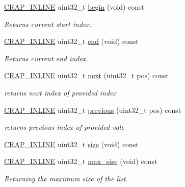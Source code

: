 \begin{DoxyCompactItemize}
\hyperlink{config__x86_8h_a5a40526b8d842e7ff731509998bb0f1c}{C\+R\+A\+P\+\_\+\+I\+N\+L\+I\+N\+E} uint32\+\_\+t \hyperlink{classcrap_1_1sorted__array__map_ab66569930959f319346503cede834f50}{begin} (void) const 
\begin{DoxyCompactList}\small\item\em Returns current start index. \end{DoxyCompactList}\item 
\hyperlink{config__x86_8h_a5a40526b8d842e7ff731509998bb0f1c}{C\+R\+A\+P\+\_\+\+I\+N\+L\+I\+N\+E} uint32\+\_\+t \hyperlink{classcrap_1_1sorted__array__map_a88304fd20fb7df521be99c13612fadb0}{end} (void) const 
\begin{DoxyCompactList}\small\item\em Returns current end index. \end{DoxyCompactList}\item 
\hyperlink{config__x86_8h_a5a40526b8d842e7ff731509998bb0f1c}{C\+R\+A\+P\+\_\+\+I\+N\+L\+I\+N\+E} uint32\+\_\+t \hyperlink{classcrap_1_1sorted__array__map_a903b54c87e2aca6d412f526b9bcddaee}{next} (uint32\+\_\+t pos) const 
\begin{DoxyCompactList}\small\item\em returns next index of provided index \end{DoxyCompactList}\item 
\hyperlink{config__x86_8h_a5a40526b8d842e7ff731509998bb0f1c}{C\+R\+A\+P\+\_\+\+I\+N\+L\+I\+N\+E} uint32\+\_\+t \hyperlink{classcrap_1_1sorted__array__map_a270442753a6e6cf7149e5ec9a07c5290}{previous} (uint32\+\_\+t pos) const 
\begin{DoxyCompactList}\small\item\em returns previous index of provided vale \end{DoxyCompactList}\item 
\hyperlink{config__x86_8h_a5a40526b8d842e7ff731509998bb0f1c}{C\+R\+A\+P\+\_\+\+I\+N\+L\+I\+N\+E} uint32\+\_\+t \hyperlink{classcrap_1_1sorted__array__map_ac22f99bfda9db68c9b72f20cd91ea860}{size} (void) const 
\item 
\hyperlink{config__x86_8h_a5a40526b8d842e7ff731509998bb0f1c}{C\+R\+A\+P\+\_\+\+I\+N\+L\+I\+N\+E} uint32\+\_\+t \hyperlink{classcrap_1_1sorted__array__map_a91c9d90b2553057b4f383c97f4176f50}{max\+\_\+size} (void) const 
\begin{DoxyCompactList}\small\item\em Returning the maximum size of the list. \end{DoxyCompactList}\item 

\end{DoxyCompactItemize}
